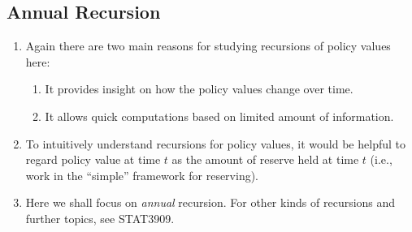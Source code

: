 \subsection{Annual Recursion}
\label{subsect:pv-annual-recursion}
\begin{enumerate}
\item Again there are two main reasons for studying recursions of policy values here:
\begin{enumerate}
\item It provides insight on how the policy values change over time.
\item It allows quick computations based on limited amount of information.
\end{enumerate}

\item To intuitively understand recursions for policy values, it would be
helpful to regard policy value at time \(t\) as the amount of reserve
 held at time \(t\) (i.e., work in the ``simple'' framework for
reserving).

\item Here we shall focus on \emph{annual} recursion. For other kinds of
recursions and further topics, see STAT3909.


\end{enumerate}
